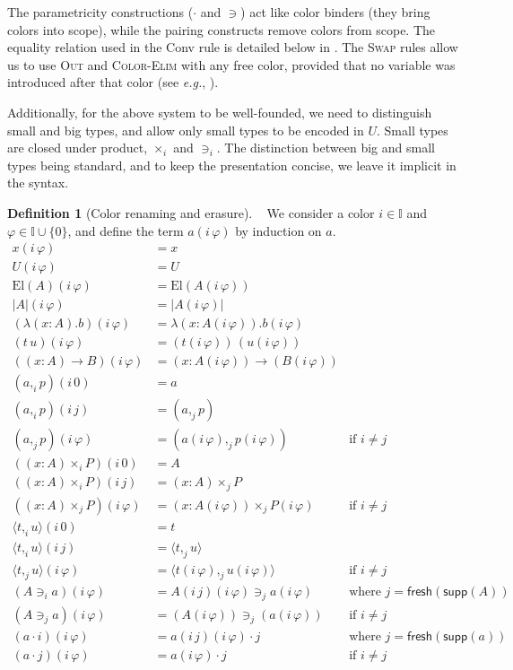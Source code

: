 \documentclass[english]{PaperTools/latex/entcs}
\theoremstyle{plain}
\theoremstyle{definition}
\newtheorem{definition}[theorem]{Definition}
\theoremstyle{remark}
\newcommand\CP[3]{(#2,_{#1} #3)}
\newcommand\CTimes[2]{(#2) ×_{#1}}
\newcommand\op[1]{∋_{#1}}
\newcommand\fp[3]{⟨#2 ,_{#1} #3⟩}
\newcommand\mor[2]{({#1}\,{#2})}
\def\fresh#1{\mathsf{fresh}(#1)}
\def\support#1{\mathsf{supp}(#1)}
\def\eg{\textit{e.g.}}
\def\El#1{\mathrm{El}(#1)}
\begin{document}
The parametricity constructions ($·$ and $∋$) act like color
binders (they bring colors into scope), while the pairing constructs
remove colors from scope.
The equality relation used in the {\sc Conv} rule is detailed below in
.  The \textsc{Swap} rules allow us to use
\textsc{Out} and \textsc{Color-Elim} with any free color, provided that
no variable was introduced after that color (see \eg, ).

Additionally, for the above system to be well-founded, we need to
distinguish small and big types, and allow only small types to be
encoded in $U$. Small types are closed under product, $×_i$ and
$∋_i$. The distinction between big and small types being standard, and
to keep the presentation concise, we leave it implicit in the syntax.

\begin{definition}[Color renaming and erasure]~
  \label{def:color-erasure}
  We consider a color $i ∈ 𝕀$ and $φ ∈ 𝕀 ∪ \{0\}$,
  and define the term $a(i\,φ)$ by induction on $a$.
\begin{align*}
  x \mor{i}{φ} & = x \\
  U \mor{i}{φ} & = U \\
  \El{A} \mor{i}{φ} & = \El {A\mor{i}{φ}} \\
  |A| \mor{i}{φ} & = |A\mor{i}{φ}| \\
  (λ(x:A).b)\mor{i}{φ} &= λ(x:A\mor{i}{φ}).b\mor{i}{φ} \\
  (t\,u)\mor{i}{φ} &= (t\mor{i}{φ}) \, (u\mor{i}{φ}) \\
  ((x:A)→B)\mor{i}{φ} &= (x:A\mor{i}{φ})→(B\mor{i}{φ}) \\
  {\CP {i} a p}\mor{i}{0} &= a \\
  {\CP {i} a p}\mor{i}{j} &= \CP {j} a p \\
  {\CP {j} a p}\mor{i}{φ} &= \CP {j} {a\mor{i}{φ}} {p\mor{i}{φ}} &\text{if $i ≠ j$} \\
  (\CTimes {i} {x:A} P)\mor{i}{0} &= A \\
  (\CTimes {i} {x:A} P)\mor{i}{j} &= \CTimes {j} {x:A} P \\
  (\CTimes {j} {x:A} P)\mor{i}{φ} &= \CTimes {j} {x:A\mor{i}{φ}} {P\mor{i}{φ}} &\text{if $i ≠ j$} \\
  {\fp {i} t u}\mor{i}{0} &= t \\
  {\fp {i} t u}\mor{i}{j} &= \fp {j} t u \\
  {\fp {j} t u}\mor{i}{φ} &= \fp {j} {t\mor{i}{φ}} {u\mor{i}{φ}} &\text{if $i ≠ j$} \\
  (A \op {i} a)\mor{i}{φ} &= {A\mor{i}{j}\mor{i}{φ}} \op {j} {a\mor{i}{φ}} &\text{where $j = \fresh{\support A}$} \\
  (A \op {j} a)\mor{i}{φ} &= (A\mor{i}{φ}) \op {j} (a\mor{i}{φ}) &\text{if $i ≠ j$} \\
%
  (a · i)\mor{i}{φ} &= a \mor{i}{j}\mor{i}{φ} · j &\text{where $j = \fresh{\support a}$} \\
  (a · j)\mor{i}{φ} &= a\mor{i}{φ} · j &\text{if $i ≠ j$} \\
  \end{align*}
\end{definition}
\end{document}
